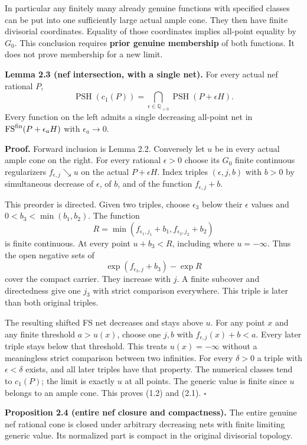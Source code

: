 \documentclass[
  10pt,
]{article}
\begin{document}
In particular any finitely many already genuine functions with specified
classes can be put into one sufficiently large actual ample cone. They
then have finite divisorial coordinates. Equality of those coordinates
implies all-point equality by \(G_0\). This conclusion requires
\textbf{prior genuine membership} of both functions. It does not prove
membership for a new limit.

\textbf{Lemma 2.3 (nef intersection, with a single net).} For every
actual nef rational \(P\), \[
 \operatorname{PSH}(c_1(P))
   =\bigcap_{\epsilon\in\mathbb Q_{>0}}
                      \operatorname{PSH}(P+\epsilon H).            \tag{2.1}
\] Every function on the left admits a single decreasing all-point net
in \(\operatorname{FS}^{\rm fin}(P+\epsilon_aH)\) with
\(\epsilon_a\to0\).

\textbf{Proof.} Forward inclusion is Lemma 2.2. Conversely let \(u\) be
in every actual ample cone on the right. For every rational
\(\epsilon>0\) choose its \(G_0\) finite continuous regularizers
\(f_{\epsilon,j}\searrow u\) on the actual \(P+\epsilon H\). Index
triples \((\epsilon,j,b)\) with \(b>0\) by simultaneous decrease of
\(\epsilon\), of \(b\), and of the function \(f_{\epsilon,j}+b\).

This preorder is directed. Given two triples, choose \(\epsilon_3\)
below their \(\epsilon\) values and \(0<b_3<\min(b_1,b_2)\). The
function \[
 R=\min(f_{\epsilon_1,j_1}+b_1,f_{\epsilon_2,j_2}+b_2)
\] is finite continuous. At every point \(u+b_3<R\), including where
\(u=-\infty\). Thus the open negative sets of \[
 \exp(f_{\epsilon_3,j}+b_3)-\exp R
\] cover the compact carrier. They increase with \(j\). A finite
subcover and directedness give one \(j_3\) with strict comparison
everywhere. This triple is later than both original triples.

The resulting shifted FS net decreases and stays above \(u\). For any
point \(x\) and any finite threshold \(a>u(x)\), choose one \(j,b\) with
\(f_{\epsilon,j}(x)+b<a\). Every later triple stays below that
threshold. This treats \(u(x)=-\infty\) without a meaningless strict
comparison between two infinities. For every \(\delta>0\) a triple with
\(\epsilon<\delta\) exists, and all later triples have that property.
The numerical classes tend to \(c_1(P)\); the limit is exactly \(u\) at
all points. The generic value is finite since \(u\) belongs to an ample
cone. This proves (1.2) and (2.1). \(\square\)

\textbf{Proposition 2.4 (entire nef closure and compactness).} The
entire genuine nef rational cone is closed under arbitrary decreasing
nets with finite limiting generic value. Its normalized part is compact
in the original divisorial topology.
\end{document}
